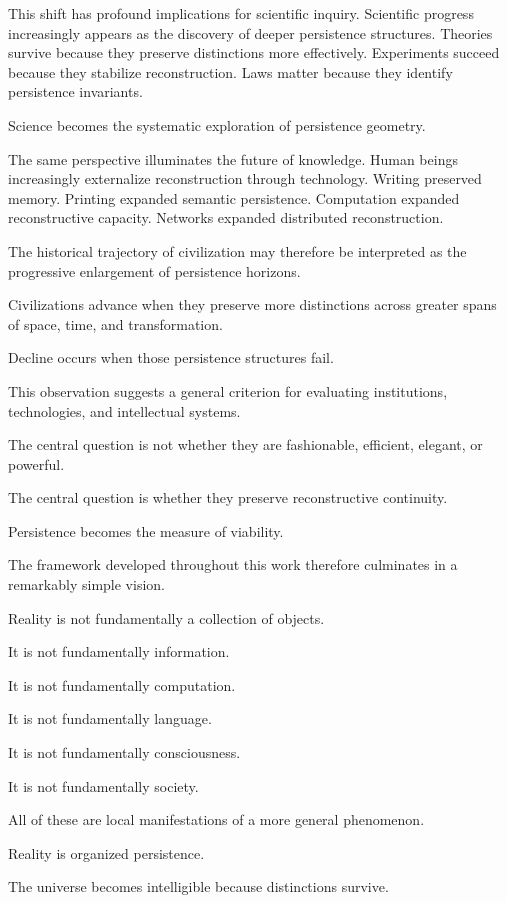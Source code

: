 \documentclass[12pt,oneside]{article}
\theoremstyle{definition}
\begin{document}
This shift has profound implications for scientific inquiry. Scientific progress increasingly appears as the discovery of deeper persistence structures. Theories survive because they preserve distinctions more effectively. Experiments succeed because they stabilize reconstruction. Laws matter because they identify persistence invariants.

Science becomes the systematic exploration of persistence geometry.

The same perspective illuminates the future of knowledge. Human beings increasingly externalize reconstruction through technology. Writing preserved memory. Printing expanded semantic persistence. Computation expanded reconstructive capacity. Networks expanded distributed reconstruction.

The historical trajectory of civilization may therefore be interpreted as the progressive enlargement of persistence horizons.

Civilizations advance when they preserve more distinctions across greater spans of space, time, and transformation.

Decline occurs when those persistence structures fail.

This observation suggests a general criterion for evaluating institutions, technologies, and intellectual systems.

The central question is not whether they are fashionable, efficient, elegant, or powerful.

The central question is whether they preserve reconstructive continuity.

Persistence becomes the measure of viability.

The framework developed throughout this work therefore culminates in a remarkably simple vision.

Reality is not fundamentally a collection of objects.

It is not fundamentally information.

It is not fundamentally computation.

It is not fundamentally language.

It is not fundamentally consciousness.

It is not fundamentally society.

All of these are local manifestations of a more general phenomenon.

Reality is organized persistence.

The universe becomes intelligible because distinctions survive.
\end{document}
